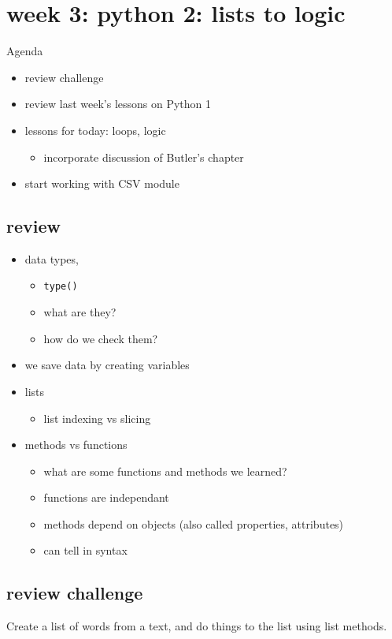 \documentclass[11pt]{article}
\author{fcalado}
\date{\today}
\title{}
\begin{document}
\tableofcontents

\section{week 3: python 2: lists to logic}
\label{sec:org0b39f74}
Agenda
\begin{itemize}
\item review challenge
\item review last week's lessons on Python 1
\item lessons for today: loops, logic
\begin{itemize}
\item incorporate discussion of Butler's chapter
\end{itemize}
\item start working with CSV module
\end{itemize}

\subsection{review}
\label{sec:orga147ad0}
\begin{itemize}
\item data types,
\begin{itemize}
\item \texttt{type()}
\item what are they?
\item how do we check them?
\end{itemize}
\item we save data by creating variables
\item lists
\begin{itemize}
\item list indexing vs slicing
\end{itemize}
\item methods vs functions
\begin{itemize}
\item what are some functions and methods we learned?
\item functions are independant
\item methods depend on objects (also called properties, attributes)
\item can tell in syntax
\end{itemize}
\end{itemize}


\subsection{review challenge}
\label{sec:orgc721252}
Create a list of words from a text, and do things to the list using
list methods.
\end{document}
